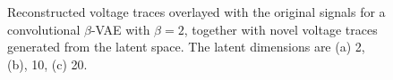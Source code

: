 \begin{figure}[!htb]
\caption{Reconstructed voltage traces overlayed with the original signals for a convolutional $\beta$-VAE with $\beta=2$, together with novel voltage traces generated from the latent space. The latent dimensions are (a) 2, (b), 10, (c) 20.}
\label{fig:hh_conv_vae_beta_2}
\end{figure}
